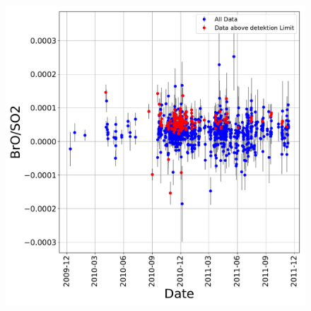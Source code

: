 \documentclass  [
  paper    = a4,
  BCOR     = 10mm,
  twoside,
  fontsize = 12pt,
  fleqn,
  toc      = bibnumbered,
  toc      = listofnumbered,
  numbers  = noendperiod,
  headings = normal,
  listof   = leveldown,
  version  = 3.03
]                                       {scrreprt}
\begin{document}
	\begin{small}	
%


	\end{small}
		\begin{figure}
		\centering
		\includegraphics[width=0.7\linewidth]{"Bilder/Results/Results_NevadoDelRuiz (1)"}
		\caption{}
		\label{fig:resultsnevadodelruiz-1}
	\end{figure}
\end{document}
